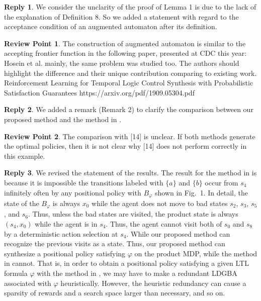 \documentclass[10 pt, dvipdfmx]{article}
\theoremstyle{definition}
\newtheorem{review point}{Review Point}[section]
\newtheorem*{reply}{Reply}
\begin{document}
\begin{reply}
  We consider the unclarity of the proof of Lemma 1 is due to the lack of the explanation of Definition 8. So we added a statement with regard to the acceptance condition of an augmented automaton after its definition.
\end{reply}

\begin{review point}
  The construction of augmented automaton is similar to the accepting
frontier function in the following paper, presented at CDC this year: Hosein et
al.  mainly, the same problem was studied too. The authors should
highlight the difference and their unique contribution comparing to
existing work.
Reinforcement Learning for Temporal Logic Control Synthesis with
Probabilistic Satisfaction Guarantees
https://arxiv.org/pdf/1909.05304.pdf
\end{review point}

\begin{reply}
  We added a remark (Remark 2) to clarify the comparison between our proposed method and the method in \cite{HAK2019,HKAKPL2019}.
\end{reply}

\begin{review point}
  The comparison with [14] is unclear. If both methods generate the
optimal policies, then it is not clear why [14] does not perform
correctly in this example.
\end{review point}

\begin{reply}
  We revised the statement of the results. The result for the method in \cite{HAK2019,HKAKPL2019} is because it is impossible the transitions labeled with $\{ a \}$ and $\{ b \}$ occur from $s_4$ infinitely often by any positional policy with $B_{\varphi}$ shown in Fig.\ 1. In detail, the state of the $B_{\varphi}$ is always $x_0$ while the agent does not move to bad states $s_2$, $s_3$, $s_5$, and $s_6$. Thus, unless the bad states are visited, the product state is always $(s_4, x_0)$ while the agent is in $s_4$. Thus, the agent cannot visit both of $s_0$ and $s_8$ by a deterministic action selection at $s_4$. While our proposed method can recognize the previous visits as a state. Thus, our proposed method can synthesize a positional policy satisfying $\varphi$ on the product MDP, while the method in \cite{HAK2019, HKAKPL2019} cannot. That is, in order to obtain a positional policy satisfying a given LTL formula $\varphi$ with the method in \cite{HAK2019,HKAKPL2019}, we may have to make a redundant LDGBA associated with $\varphi$ heuristically. However, the heuristic redundancy can cause a sparsity of rewards and a search space larger than necessary, and so on.
\end{reply}
\end{document}

